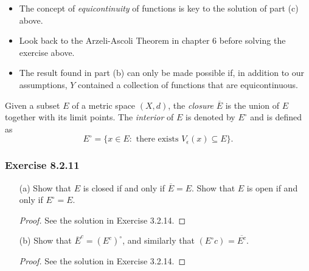 \begin{itemize}
    \item The concept of \textit{equicontinuity} of functions is key to the solution of part (c) above.
    \item Look back to the Arzeli-Ascoli Theorem in chapter 6 before solving the exercise above.
    \item The result found in part (b) can only be made possible if, in addition to our assumptions, \( Y  \) contained a collection of functions that are equicontinuous.
\end{itemize}

\begin{definition}[Closure]
    Given a subset \( E  \) of a metric space \( (X,d)  \), the \textit{closure} \( \overline{E} \) is the union of \( E  \) together with its limit points. The \textit{interior} of \( E \) is denoted by \( E^{\circ} \) and is defined as 
    \[  E^{\circ} = \{ x \in E : \text{ there exists } V_{\epsilon }(x) \subseteq E  \}. \]
\end{definition}


\subsubsection{Exercise 8.2.11} 
\begin{enumerate}
    \item[(a)] Show that \( E  \) is closed if and only if \( \overline{E} = E  \). Show that \( E  \) is open if and only if \( E^{\circ} = E  \). 
        \begin{proof}
        See the solution in Exercise 3.2.14. 
        \end{proof}
    \item[(b)] Show that \( \overline{E}^{c} = (E^{c})^{\circ}  \), and similarly that \( (E^{\circ}c)^{} = \overline{E^{c}} \).
        \begin{proof}
        See the solution in Exercise 3.2.14.
        \end{proof}
\end{enumerate}


